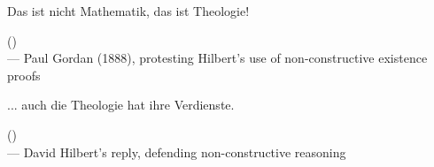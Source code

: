 \begin{flushright}
\itshape
\begin{hangleftquote}{\QDEOpen}{\QDEClose}
Das ist nicht Mathematik, das ist Theologie!
\end{hangleftquote}
\par\smallskip
\normalfont () \\
— Paul Gordan (1888), protesting Hilbert's use of non-constructive existence proofs
\end{flushright}    
\vspace{2em}

\begin{flushright}
\itshape
\begin{hangleftquote}{\QDEOpen}{\QDEClose}
... auch die Theologie hat ihre Verdienste.
\end{hangleftquote}
\par\smallskip
\normalfont () \\
— David Hilbert's reply, defending non-constructive reasoning
\end{flushright}
